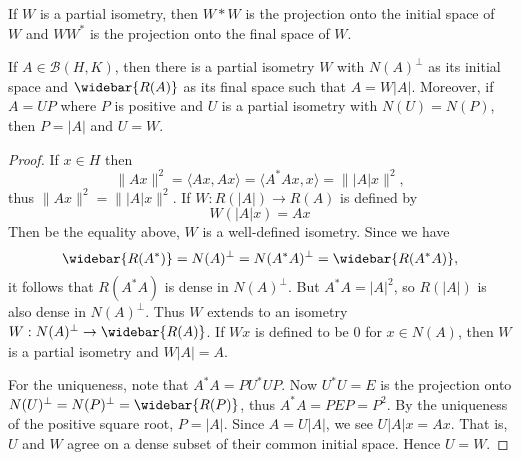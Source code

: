 \begin{proposition}
If $W$ is a partial isometry, then $W*W$ is the projection onto the initial space of $W$ and $WW^*$ is the projection onto the final space of $W$.
\end{proposition}
\begin{theorem}
If $A\in\mathcal{B}(H,K)$, then there is a partial isometry $W$ with $N(A)^\bot$ as its initial space and $\widebar{R(A)}$ as its final space such that $A=W|A|$. Moreover, if $A=UP$ where $P$ is positive and $U$ is a partial isometry with $N(U)=N(P)$, then $P=|A|$ and $U=W$.
\end{theorem}
\begin{proof}
If $x\in H$ then
\[\|Ax\|^2=\langle Ax,Ax\rangle=\langle A^*Ax,x\rangle=\||A|x\|^2,\]
thus $\|Ax\|^2=\||A|x\|^2$. If $W:R(|A|)\to R(A)$ is defined by
\[W(|A|x)=Ax\]
Then be the equality above, $W$ is a well-defined isometry. Since we have
\[\widebar{R(A^*)}=N(A)^\bot=N(A^*A)^\bot=\widebar{R(A^*A)},\] 
it follows that $R(A^*A)$ is dense in $N(A)^\bot$. But $A^*A=|A|^2$, so $R(|A|)$ is also dense in $N(A)^\bot$. Thus $W$ extends to an isometry $W:N(A)^\bot\to\widebar{R(A)}$. If $Wx$ is defined to be $0$ for $x\in N(A)$, then $W$ is a partial isometry and $W|A|=A$.\par
For the uniqueness, note that $A^*A=PU^*UP$. Now $U^*U=E$ is the projection onto $N(U)^\bot=N(P)^\bot=\widebar{R(P)}$, thus $A^*A=PEP=P^2$. By the uniqueness of the positive square root, $P=|A|$. Since $A=U|A|$, we see $U|A|x=Ax$. That is, $U$ and $W$ agree on a dense subset of their common initial space. Hence $U=W$.
\end{proof}
